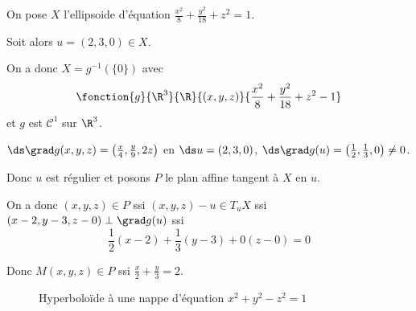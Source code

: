 \begin{exemple}
    On pose $X$ l'ellipsoide d'équation $\displaystyle \frac{x^2} 8 + \frac{y^2}{18} + z^2 = 1$.

    Soit alors $u = (2, 3, 0) \in X$. 

    On a donc $X = g^{-1}(\{0\})$ avec 
    $$\fonction{g}{\R^3}{\R}{(x, y, z)}{\frac{x^2} 8 + \frac{y^2}{18} + z^2 - 1}$$
    et $g$ est $\mathscr C^1$ sur $\R^3$. 

    $\ds \grad g (x, y, z) = \left( \frac{x} 4, \frac{y} 9, 2z \right)$ en 
    $\ds u = (2, 3, 0)$, $\ds \grad g(u) = \left( \frac 1 2, \frac 1 3, 0 \right) \neq 0$.

    Donc $u$ est régulier et posons $P$ le plan affine tangent à $X$ en $u$.

    On a donc $(x, y, z) \in P$ ssi $(x, y, z) - u \in T_uX$ ssi $(x - 2, y - 3, z - 0) \perp \grad g(u)$ ssi
    $$\frac 1 2 (x - 2) + \frac 1 3 (y - 3) + 0 (z - 0) = 0$$

    Donc $M (x, y, z) \in P$ ssi $\displaystyle \frac x 2 + \frac y 3 = 2$.
\end{exemple}

\begin{figure}[h]
\begin{center}

\end{center}
\caption{Hyperboloïde à une nappe d'équation $x^2 + y^2 - z^2 = 1$}
\end{figure}

